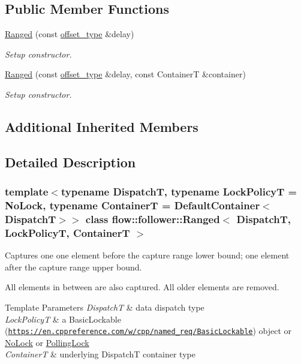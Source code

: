 \subsection*{Public Member Functions}
\begin{DoxyCompactItemize}
\item 
\hyperlink{classflow_1_1follower_1_1_ranged_ae875d4520ce12d84cb9ebe10762d2c13}{Ranged} (const \hyperlink{classflow_1_1follower_1_1_ranged_ab5003d120aa00aaa2073625893228024}{offset\+\_\+type} \&delay)
\begin{DoxyCompactList}\small\item\em Setup constructor. \end{DoxyCompactList}\item 
\hyperlink{classflow_1_1follower_1_1_ranged_a4902671b662c881333e3c574f3793931}{Ranged} (const \hyperlink{classflow_1_1follower_1_1_ranged_ab5003d120aa00aaa2073625893228024}{offset\+\_\+type} \&delay, const ContainerT \&container)
\begin{DoxyCompactList}\small\item\em Setup constructor. \end{DoxyCompactList}\end{DoxyCompactItemize}
\subsection*{Additional Inherited Members}


\subsection{Detailed Description}
\subsubsection*{template$<$typename DispatchT, typename Lock\+PolicyT = No\+Lock, typename ContainerT = Default\+Container$<$\+Dispatch\+T$>$$>$\newline
class flow\+::follower\+::\+Ranged$<$ Dispatch\+T, Lock\+Policy\+T, Container\+T $>$}

Captures one one element before the capture range lower bound; one element after the capture range upper bound. 

All elements in between are also captured. All older elements are removed.


\begin{DoxyTemplParams}{Template Parameters}
{\em DispatchT} & data dispatch type \\
\hline
{\em Lock\+PolicyT} & a Basic\+Lockable (\href{https://en.cppreference.com/w/cpp/named_req/BasicLockable}{\tt https\+://en.\+cppreference.\+com/w/cpp/named\+\_\+req/\+Basic\+Lockable}) object or \hyperlink{structflow_1_1_no_lock}{No\+Lock} or \hyperlink{structflow_1_1_polling_lock}{Polling\+Lock} \\
\hline
{\em ContainerT} & underlying {\ttfamily DispatchT} container type \\
\hline
\end{DoxyTemplParams}


